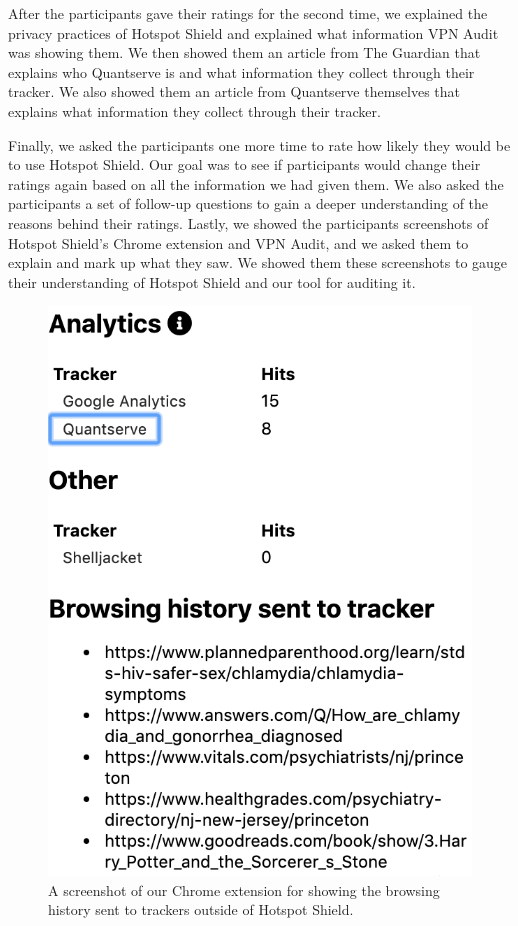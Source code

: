 After the participants gave their ratings for the second time, we explained the privacy practices of Hotspot Shield and explained what information VPN Audit was showing them.
We then showed them an article from The Guardian that explains who Quantserve is and what information they collect through their tracker.
We also showed them an article from Quantserve themselves that explains what information they collect through their tracker.

Finally, we asked the participants one more time to rate how likely they would
be to use Hotspot Shield.  Our goal was to see if participants would change
their ratings again based on all the information we had given them.  We also
asked the participants a set of follow-up questions to gain a deeper
understanding of the reasons behind their ratings.  Lastly, we showed the
participants screenshots of Hotspot Shield's Chrome extension and VPN Audit,
and we asked them to explain and mark up what they saw.  We showed them these
screenshots to gauge their understanding of Hotspot Shield and our tool for
auditing it.



\begin{figure}[t]
    \includegraphics[width=0.85\linewidth]{sections/figures/vpn-audit.png}
    \caption{A screenshot of our Chrome extension for showing the browsing history sent to trackers outside of Hotspot Shield.}
    \label{fig:vpn-audit}
\end{figure}


